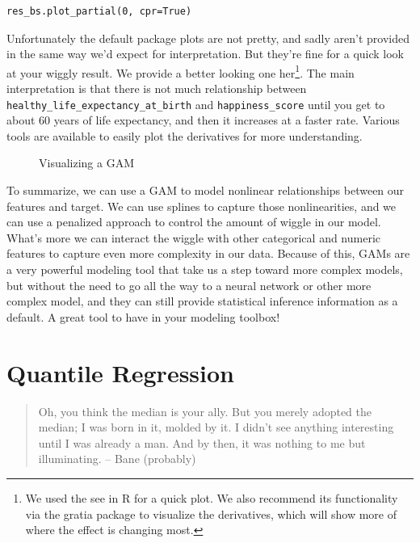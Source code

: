 \documentclass[
  letterpaper,
]{krantz}
\begin{document}
\begin{verbatim}
res_bs.plot_partial(0, cpr=True)
\end{verbatim}

Unfortunately the default package plots are not pretty, and sadly aren't
provided in the same way we'd expect for interpretation. But they're
fine for a quick look at your wiggly result. We provide a better looking
one her\footnote{We used the {see} in R for a quick plot. We also
  recommend its functionality via the {gratia} package to visualize the
  derivatives, which will show more of where the effect is changing
  most.}. The main interpretation is that there is not much relationship
between \texttt{healthy\_life\_expectancy\_at\_birth} and
\texttt{happiness\_score} until you get to about 60 years of life
expectancy, and then it increases at a faster rate. Various tools are
available to easily plot the derivatives for more understanding.

\begin{figure}[H]


\caption{\label{fig-gam-plot}Visualizing a GAM}

\end{figure}%

To summarize, we can use a GAM to model nonlinear relationships between
our features and target. We can use splines to capture those
nonlinearities, and we can use a penalized approach to control the
amount of wiggle in our model. What's more we can interact the wiggle
with other categorical and numeric features to capture even more
complexity in our data. Because of this, GAMs are a very powerful
modeling tool that take us a step toward more complex models, but
without the need to go all the way to a neural network or other more
complex model, and they can still provide statistical inference
information as a default. A great tool to have in your modeling toolbox!

\section{Quantile Regression}\label{sec-lm-extend-quantile}

\begin{quote}
Oh, you think the median is your ally. But you merely adopted the
median; I was born in it, molded by it. I didn't see anything
interesting until I was already a man. And by then, it was nothing to me
but illuminating. -- Bane (probably)
\end{quote}
\end{document}
